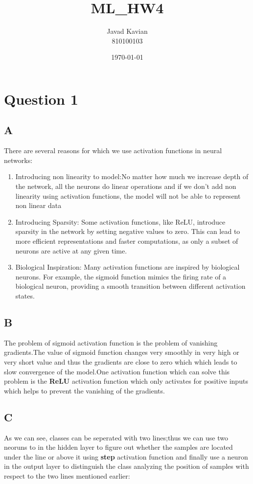 \documentclass{article}
\title{ML\_HW4}
\author{Javad Kavian\\810100103}
\date{\today}
\begin{document}
\maketitle

\section*{Question 1}

\subsection*{A}
There are several reasons for which we use activation functions in neural networks:
\begin{enumerate}
\item Introducing non linearity to model:No matter how much we increase depth of the network, all the neurons do linear operations and if we don't add non linearity using activation functions, the model will not be able to represent non linear data

\item Introducing Sparsity: Some activation functions, like ReLU, introduce sparsity in the network by setting negative values to zero. This can lead to more efficient representations and faster computations, as only a subset of neurons are active at any given time.

\item Biological Inspiration: Many activation functions are inspired by biological neurons. For example, the sigmoid function mimics the firing rate of a biological neuron, providing a smooth transition between different activation states.
\end{enumerate}


\subsection*{B}
The problem of sigmoid activation function is the problem of vanishing gradients.The value of sigmoid function changes very smoothly in very high or very short value and thus the gradients are close to zero which which leads to slow convergence of the model.One activation function which can solve this problem is the \textbf{ReLU} activation function which only activates for positive inputs which helps to prevent the vanishing of the gradients.

\subsection*{C}
As we can see, classes can be seperated with two lines;thus we can use two neoruns to in the hidden layer to figure out whether the samples are located under the line or above it using \textbf{step} activation function and finally use a neuron in the output layer to distinguish the class analyzing the position of samples with respect to the two lines mentioned earlier:
\end{document}

